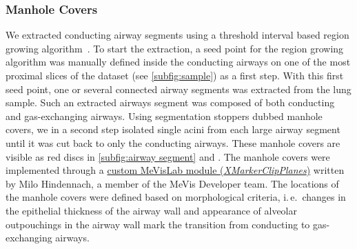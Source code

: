 \documentclass[%
	twoside,
	paper=a4,%
	abstract=true,%
	]{scrartcl}
\newcommand{\ie}{i.\,e.\ }
\begin{document}
\subsubsection{Manhole Covers}
We extracted conducting airway segments using a threshold interval based region growing algorithm~\cite{Zucker1976}. To start the extraction, a seed point for the region growing algorithm was manually defined inside the conducting airways on one of the most proximal slices of the dataset (see \autoref{subfig:sample}) as a first step. With this first seed point, one or several connected airway segments was extracted from the lung sample. Such an extracted airways segment was composed of both conducting and gas-exchanging airways. Using segmentation stoppers dubbed manhole covers, we in a second step isolated single acini from each large airway segment until it was cut back to only the conducting airways. These manhole covers are visible as red discs in \autoref{subfig:airway segment} and . The manhole covers were implemented through a \href{http://www.mevis-research.de/cgi-bin/discus/board-auth.cgi?lm=1282233250&file=/839/11760.html}{custom MeVisLab module (\emph{XMarkerClipPlanes})} written by Milo Hindennach, a member of the MeVis Developer team. The locations of the manhole covers were defined based on morphological criteria, \ie changes in the epithelial thickness of the airway wall and appearance of alveolar outpouchings in the airway wall mark the transition from conducting to gas-exchanging airways.
\end{document}
